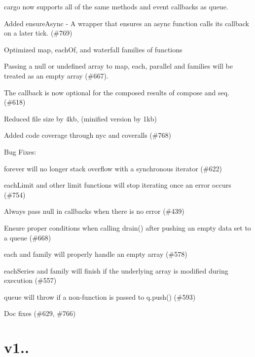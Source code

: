 \begin{DoxyItemize}
\item {\ttfamily cargo} now supports all of the same methods and event callbacks as {\ttfamily queue}.
\item Added {\ttfamily ensure\+Async} -\/ A wrapper that ensures an async function calls its callback on a later tick. (\#769)
\item Optimized {\ttfamily map}, {\ttfamily each\+Of}, and {\ttfamily waterfall} families of functions
\item Passing a {\ttfamily null} or {\ttfamily undefined} array to {\ttfamily map}, {\ttfamily each}, {\ttfamily parallel} and families will be treated as an empty array (\#667).
\item The callback is now optional for the composed results of {\ttfamily compose} and {\ttfamily seq}. (\#618)
\item Reduced file size by 4kb, (minified version by 1kb)
\item Added code coverage through {\ttfamily nyc} and {\ttfamily coveralls} (\#768)
\end{DoxyItemize}

Bug Fixes\+:


\begin{DoxyItemize}
\item {\ttfamily forever} will no longer stack overflow with a synchronous iterator (\#622)
\item {\ttfamily each\+Limit} and other limit functions will stop iterating once an error occurs (\#754)
\item Always pass {\ttfamily null} in callbacks when there is no error (\#439)
\item Ensure proper conditions when calling {\ttfamily drain()} after pushing an empty data set to a queue (\#668)
\item {\ttfamily each} and family will properly handle an empty array (\#578)
\item {\ttfamily each\+Series} and family will finish if the underlying array is modified during execution (\#557)
\item {\ttfamily queue} will throw if a non-\/function is passed to {\ttfamily q.\+push()} (\#593)
\item Doc fixes (\#629, \#766)
\end{DoxyItemize}

\section*{v1..}

